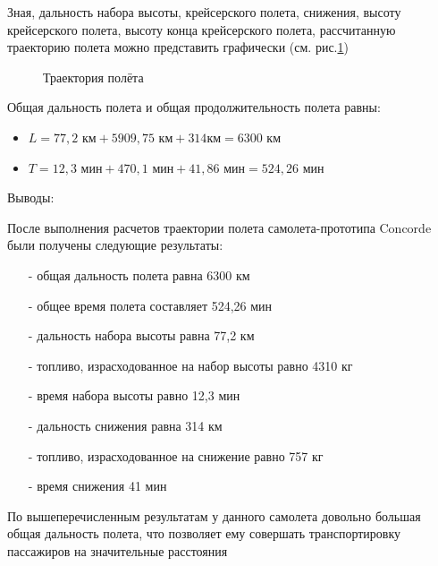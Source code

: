 Зная, дальность набора высоты, крейсерского полета, снижения, высоту крейсерского полета, высоту конца крейсерского полета, рассчитанную траекторию полета можно представить графически (см. рис.\ref{fig:Траектория полёта}) 


\begin{figure}[H]
    \caption{Траектория полёта}
    \label{fig:Траектория полёта}
\end{figure}

Общая дальность полета и общая продолжительность полета равны:
\begin{itemize}
    \item  $L = 77,2 \text{ км} + 5909,75 \text{ км} + 314км = 6300\text{ км}$
    \item  $T = 12,3 \text{ мин} + 470,1 \text{ мин} + 41,86 \text{ мин} = 524,26 \text{ мин}$
\end{itemize}

\begin{center}
    Выводы:
\end{center}

После выполнения расчетов траектории полета самолета-прототипа Concorde
были получены следующие результаты:
\begin{itemize}
\item[-] общая дальность полета равна 6300 км
\item[-] общее время полета составляет 524,26 мин
\item[-] дальность набора высоты равна 77,2 км
\item[-] топливо, израсходованное на набор высоты равно 4310 кг
\item[-] время набора высоты равно 12,3 мин
\item[-] дальность снижения равна 314 км
\item[-] топливо, израсходованное на снижение равно 757 кг
\item[-] время снижения 41 мин
\end{itemize}
По вышеперечисленным результатам у данного самолета довольно большая
общая дальность полета, что позволяет ему совершать транспортировку
пассажиров на значительные расстояния 